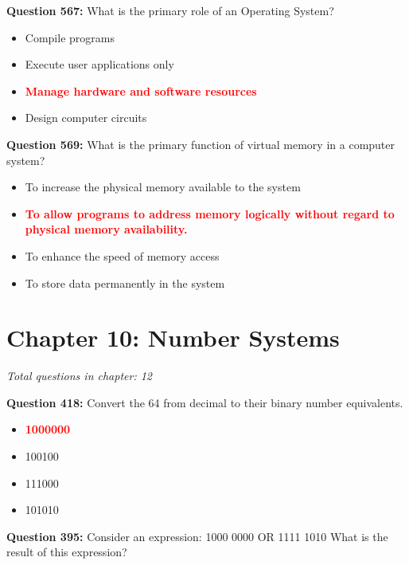 \documentclass[12pt,a4paper]{article}
\begin{document}
\textbf{Question 567:} What is the primary role of an Operating System?

\begin{itemize}
    \item[\textbf{A.}] Compile programs
    \item[\textbf{B.}] Execute user applications only
    \item[\textbf{C.}] \textcolor{red}{\textbf{Manage hardware and software resources}}
    \item[\textbf{D.}] Design computer circuits
\end{itemize}

\textbf{Question 569:} What is the primary function of virtual memory in a computer system?

\begin{itemize}
    \item[\textbf{A.}] To increase the physical memory available to the system
    \item[\textbf{B.}] \textcolor{red}{\textbf{To allow programs to address memory logically without regard to physical memory availability.}}
    \item[\textbf{C.}] To enhance the speed of memory access
    \item[\textbf{D.}] To store data permanently in the system
\end{itemize}

\section{Chapter 10: Number Systems}
\textit{Total questions in chapter: 12}

\textbf{Question 418:} Convert the 64 from decimal to their binary number equivalents.

\begin{itemize}
    \item[\textbf{A.}] \textcolor{red}{\textbf{1000000}}
    \item[\textbf{B.}] 100100
    \item[\textbf{C.}] 111000
    \item[\textbf{D.}] 101010
\end{itemize}

\vspace{0.5cm}

\vspace{0.5cm}

\textbf{Question 395:} Consider an expression: 1000 0000 OR 1111 1010 What is the result of this expression?
\end{document}
